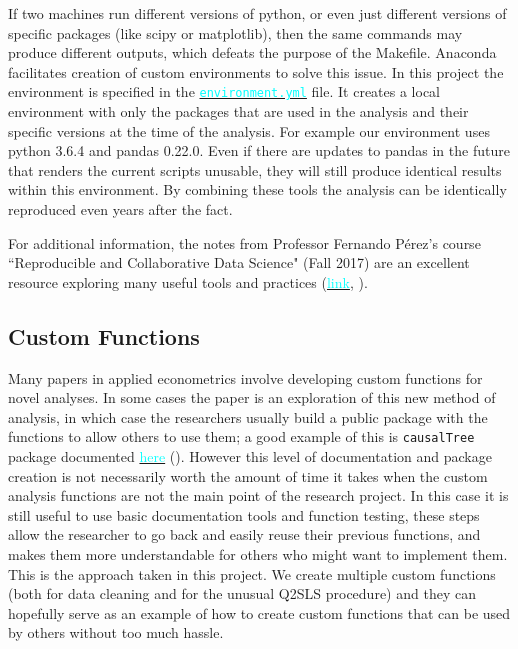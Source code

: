 \documentclass[12pt]{article}
\newcommand{\inlinecode}{\texttt}
\begin{document}
If two machines run different versions of python, or even just different versions of specific packages (like scipy or matplotlib), then the same commands may produce different outputs, which defeats the purpose of the Makefile. Anaconda facilitates creation of custom environments to solve this issue. In this project the environment is specified in the \href{https://github.com/nadavtadelis/Reproducible_Metrics/blob/master/environment.yml}{\textcolor{cyan}{\inlinecode{environment.yml}}} file. It creates a local environment with only the packages that are used in the analysis and their specific versions at the time of the analysis. For example our environment uses python 3.6.4 and pandas 0.22.0. Even if there are updates to pandas in the future that renders the current scripts unusable, they will still produce identical results within this environment. By combining these tools the analysis can be identically reproduced even years after the fact.

For additional information, the notes from Professor Fernando P\'erez's course ``Reproducible and Collaborative Data Science" (Fall 2017) are an excellent resource exploring many useful tools and practices (\href{https://berkeley-stat159-f17.github.io/stat159-f17/}{\textcolor{cyan}{link}}, \cite{stat159}).

\subsection{Custom Functions}
Many papers in applied econometrics involve developing custom functions for novel analyses. In some cases the paper is an exploration of this new method of analysis, in which case the researchers usually build a public package with the functions to allow others to use them; a good example of this is \inlinecode{causalTree} package documented \href{https://github.com/susanathey/causalTree}{\textcolor{cyan}{here}} (\cite{causalTree}). However this level of documentation and package creation is not necessarily worth the amount of time it takes when the custom analysis functions are not the main point of the research project. In this case it is still useful to use basic documentation tools and function testing, these steps allow the researcher to go back and easily reuse their previous functions, and makes them more understandable for others who might want to implement them. This is the approach taken in this project. We create multiple custom functions (both for data cleaning and for the unusual Q2SLS procedure) and they can hopefully serve as an example of how to create custom functions that can be used by others without too much hassle. 
\end{document}
